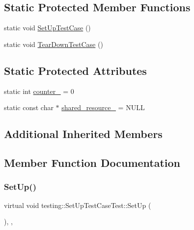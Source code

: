 \subsection*{Static Protected Member Functions}
\begin{DoxyCompactItemize}
\item 
static void \hyperlink{classtesting_1_1_set_up_test_case_test_a50732abc0bcb3725e6dfd6a2d487e944}{Set\+Up\+Test\+Case} ()
\item 
static void \hyperlink{classtesting_1_1_set_up_test_case_test_abdc133cd161ff2fa317f489da9bdccf3}{Tear\+Down\+Test\+Case} ()
\end{DoxyCompactItemize}
\subsection*{Static Protected Attributes}
\begin{DoxyCompactItemize}
\item 
static int \hyperlink{classtesting_1_1_set_up_test_case_test_a5b6e811128d35389be49f6569bf93817}{counter\+\_\+} = 0
\item 
static const char $\ast$ \hyperlink{classtesting_1_1_set_up_test_case_test_a904e77fd9a628b6a9aca0280665fd040}{shared\+\_\+resource\+\_\+} = N\+U\+LL
\end{DoxyCompactItemize}
\subsection*{Additional Inherited Members}


\subsection{Member Function Documentation}
\mbox{\label{classtesting_1_1_set_up_test_case_test_a4b44551ccf73e66de7ec95b2ab3b2085}} 
\subsubsection{\texorpdfstring{Set\+Up()}{SetUp()}}
{\footnotesize\ttfamily virtual void testing\+::\+Set\+Up\+Test\+Case\+Test\+::\+Set\+Up (\begin{DoxyParamCaption}{ }\end{DoxyParamCaption})\hspace{0.3cm}{\ttfamily [inline]}, {\ttfamily [protected]}, {\ttfamily [virtual]}}



